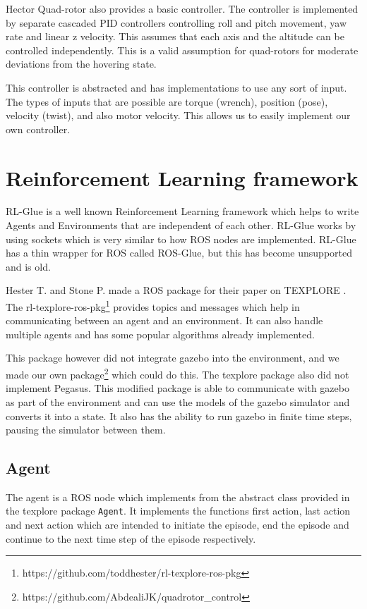 \documentclass[hidelinks,BTech]{iitmdiss}
\begin{document}
Hector Quad-rotor also provides a basic controller. The controller is implemented by separate cascaded PID controllers controlling roll and pitch movement, yaw rate and linear z velocity. This assumes that each axis and the altitude can be controlled independently. This is a valid assumption for quad-rotors for moderate deviations from the hovering state.

This controller is abstracted and has implementations to use any sort of input. The types of inputs that are possible are torque (wrench), position (pose), velocity (twist), and also motor velocity. This allows us to easily implement our own controller.

\section{Reinforcement Learning framework}

RL-Glue \cite{RLGlue} is a well known Reinforcement Learning framework which helps to write Agents and Environments that are independent of each other. RL-Glue works by using sockets which is very similar to how ROS nodes are implemented. RL-Glue has a thin wrapper for ROS called ROS-Glue, but this has become unsupported and is old.

Hester T. and Stone P. made a ROS package for their paper on TEXPLORE \cite{Texplore}. The rl-texplore-ros-pkg\footnote{https://github.com/toddhester/rl-texplore-ros-pkg} provides topics and messages which help in communicating between an agent and an environment. It can also handle multiple agents and has some popular algorithms already implemented.

This package however did not integrate gazebo into the environment, and we made our own package\footnote{https://github.com/AbdealiJK/quadrotor\_control} which could do this. The texplore package also did not implement Pegasus. This modified package is able to communicate with gazebo as part of the environment and can use the models of the gazebo simulator and converts it into a state. It also has the ability to run gazebo in finite time steps, pausing the simulator between them.

\subsection*{Agent}

The agent is a ROS node which implements from the abstract class provided in the texplore package \texttt{Agent}. It implements the functions first action, last action and next action which are intended to initiate the episode, end the episode and continue to the next time step of the episode respectively.
\end{document}
